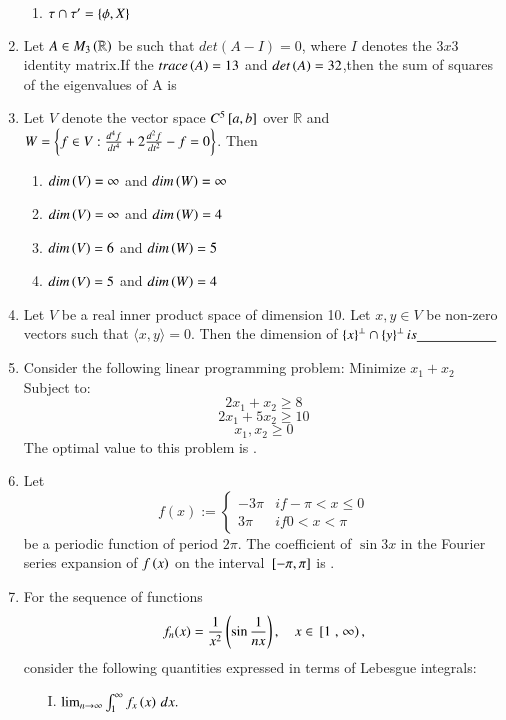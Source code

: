 \documentclass[journal]{IEEEtran}
\begin{document}
\begin{enumerate}
\begin{enumerate}
      \item $\tau \cap \tau' = \left\{\phi, X\right\}$
  \end{enumerate}
  \item Let $A \in M_3\left(\mathbb{R}\right)$ be such that $det(A-I) = 0$, where $I$ denotes the $3 x 3$ identity matrix.If the $trace\left(A\right) = 13$ and $det\left(A\right) = 32$,then the sum of squares of the eigenvalues of A is \underline{\hspace{2cm}} 
  \item Let $V$ denote the vector space $C^5{}\left[a,b\right]$ over $\mathbb{R}$ and $W = \left\{ f \in V : \frac{d^4 f}{dt^4} + 2 \frac{d^2 f}{dt^2} - f = 0\right\}$. Then
  \begin{enumerate}
    \item $dim\left(V\right) = \infty$ and $dim\left(W\right) = \infty$
    \item $dim\left(V\right) = \infty$ and $dim\left(W\right) = 4$
    \item $dim\left(V\right) = 6$ and $dim\left(W\right) = 5$
    \item $dim\left(V\right) = 5$ and $dim\left(W\right) = 4$
\end{enumerate}
\item Let $V$ be a real inner product space of dimension 10. Let $x, y \in V$ be non-zero vectors such that $\langle x, y \rangle = 0$. Then the dimension of $\left\{x\right\}^\perp \cap \left\{y\right\}^\perp is \underline{\hspace{2cm}}$
\item Consider the following linear programming problem: Minimize $x_1 + x_2$ Subject to:
$$2x_1 + x_2 \geq 8$$
$$2x_1 + 5x_2 \geq 10$$
$$x_1, x_2 \geq 0$$
The optimal value to this problem is \underline{\hspace{2cm}}.
\item Let $$f(x) :=\begin{cases}
-3\pi & if  -\pi < x \leq 0 \\
3\pi & if  0 < x < \pi
\end{cases}$$ be a periodic function of period $2\pi$. The coefficient of $\sin 3x$ in the Fourier series expansion of $f\left(x\right)$ on the interval ${}\left[-\pi, \pi\right]$ is \underline{\hspace{2cm}}.
\item For the sequence of functions 
$$f_n(x) = \frac{1}{x^2} \left(\sin\frac{1}{n x}\right), \quad x \in {}\left[1\right., \left.\infty\right),$$
consider the following quantities expressed in terms of Lebesgue integrals:
\begin{enumerate}
    \item[I.] $\lim_{n \to \infty} \int_1^\infty f_x\left(x\right) \, dx.$

\end{enumerate}
\end{enumerate}
\end{document}
